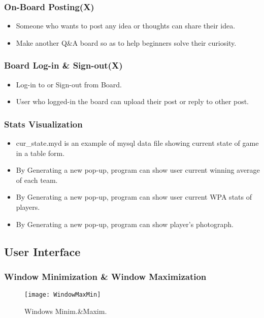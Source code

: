 \documentclass[conference,compsoc, twocolumn]{IEEEtran}
\begin{document}
\subsubsection{On-Board Posting(X)}
\begin{itemize}
\item Someone who wants to post any idea or thoughts can share their idea.
\item Make another Q&A board so as to help beginners solve their curiosity.
\end{itemize}

\subsubsection{Board Log-in \& Sign-out(X)}
\begin{itemize}
\item Log-in to or Sign-out from Board.
\item User who logged-in the board can upload their post or reply to other post.
\end{itemize}

\subsubsection{Stats Visualization}
\begin{itemize}
\item cur\_state.myd is an example of mysql data file showing current state of game in a table form.
\item By Generating a new pop-up, program can show user current winning average of each team.
\item By Generating a new pop-up, program can show user current WPA stats of players.
\item By Generating a new pop-up, program can show player's photograph.
\end{itemize}



\subsection{User Interface}


\subsubsection{Window Minimization & Window Maximization}
\begin{figure}[h]
\centering\texttt{[image: WindowMaxMin]}
\caption{Windows Minim.\&Maxim.}
\end{figure}
\end{document}
